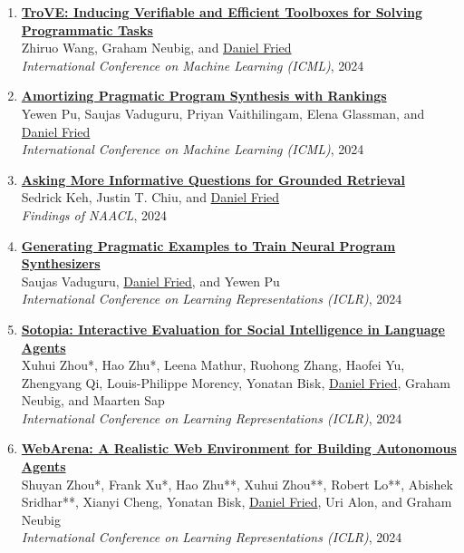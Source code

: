\begin{enumerate}[leftmargin=-1mm,partopsep=0pt]
\item \href{https://arxiv.org/abs/2401.12869}{\textbf{TroVE: Inducing Verifiable and Efficient Toolboxes for Solving Programmatic Tasks}} \\
  Zhiruo Wang, Graham Neubig, and \underline{Daniel Fried}\\
  \emph{International Conference on Machine Learning (ICML)}, 2024

\item \href{https://arxiv.org/abs/2407.02499}{\textbf{Amortizing Pragmatic Program Synthesis with Rankings}} \\
  Yewen Pu, Saujas Vaduguru, Priyan Vaithilingam, Elena Glassman, and \underline{Daniel Fried}\\
  \emph{International Conference on Machine Learning (ICML)}, 2024

\item \href{https://arxiv.org/abs/2311.08584}{\textbf{Asking More Informative Questions for Grounded Retrieval}} \\
  Sedrick Keh, Justin T. Chiu, and \underline{Daniel Fried}\\
  \emph{Findings of NAACL}, 2024

\item \href{https://arxiv.org/abs/2311.05740}{\textbf{Generating Pragmatic Examples to Train Neural Program Synthesizers}} \\
  Saujas Vaduguru, \underline{Daniel Fried}, and Yewen Pu\\
  \emph{International Conference on Learning Representations (ICLR)}, 2024

\item \href{http://arxiv.org/abs/2310.11667}{\textbf{Sotopia: Interactive Evaluation for Social Intelligence in Language Agents}} \\
  Xuhui Zhou*, Hao Zhu*, Leena Mathur, Ruohong Zhang, Haofei Yu, Zhengyang Qi, Louis-Philippe Morency, Yonatan Bisk, \underline{Daniel Fried}, Graham Neubig, and Maarten Sap\\
  \emph{International Conference on Learning Representations (ICLR)}, 2024

\item \href{https://arxiv.org/abs/2307.13854}{\textbf{WebArena: A Realistic Web Environment for Building Autonomous Agents}} \\
  Shuyan Zhou*, Frank Xu*, Hao Zhu**, Xuhui Zhou**, Robert Lo**, Abishek Sridhar**, Xianyi Cheng, Yonatan Bisk, \underline{Daniel Fried}, Uri Alon, and Graham Neubig\\
  \emph{International Conference on Learning Representations (ICLR)}, 2024


\end{enumerate}
